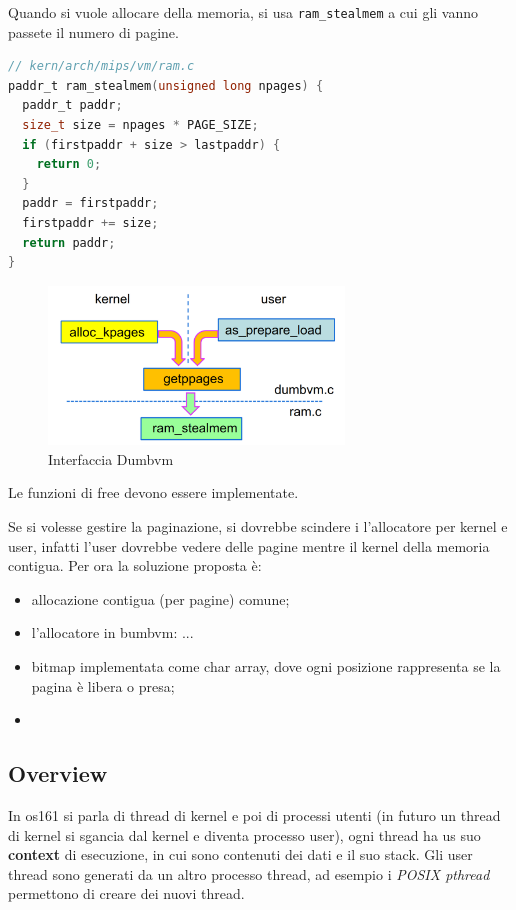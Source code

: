 \documentclass[12pt]{article}
\begin{document}
Quando si vuole allocare della memoria, si usa \texttt{ram\_stealmem} a cui gli vanno passete il numero di pagine.
\begin{lstlisting}[language=c]
// kern/arch/mips/vm/ram.c
paddr_t ram_stealmem(unsigned long npages) {
  paddr_t paddr;
  size_t size = npages * PAGE_SIZE;
  if (firstpaddr + size > lastpaddr) {
    return 0;
  }
  paddr = firstpaddr;
  firstpaddr += size;
  return paddr;
}
\end{lstlisting}
\begin{figure}[H]
  \centering
  \includegraphics[width=0.7\textwidth]{interfaccia-dumbvm.png}
  \caption{Interfaccia Dumbvm}
  \label{fig:interfaccia-dumbvm}
\end{figure}
Le funzioni di free devono essere implementate.


Se si volesse gestire la paginazione, si dovrebbe scindere i l'allocatore per kernel e user, infatti l'user dovrebbe vedere delle pagine mentre il kernel della memoria contigua. Per ora la soluzione proposta \`e:
\begin{itemize}
  \item allocazione contigua (per pagine) comune;
  \item l'allocatore in bumbvm: ...
  \item bitmap implementata come char array, dove ogni posizione rappresenta se la pagina \`e libera o presa;
  \item 
\end{itemize}


\subsection{Overview}
In os161 si parla di thread di kernel e poi di processi utenti (in futuro un thread di kernel si sgancia dal kernel e diventa processo user), ogni thread ha us suo \textbf{context} di esecuzione, in cui sono contenuti dei dati e il suo stack. Gli user thread sono generati da un altro processo thread, ad esempio i \emph{POSIX pthread} permettono di creare dei nuovi thread.
\end{document}
